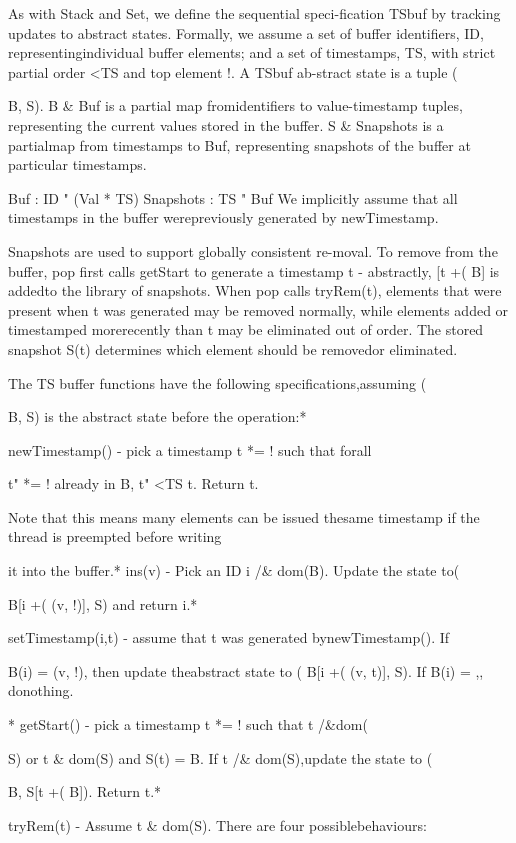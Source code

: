 As with Stack and Set, we define the sequential speci-fication TSbuf by tracking updates to abstract states. Formally, we assume a set of buffer identifiers, ID, representingindividual buffer elements; and a set of timestamps, TS, with
strict partial order <TS and top element !. A TSbuf ab-stract state is a tuple (

B, S). B & Buf is a partial map fromidentifiers to value-timestamp tuples, representing the current values stored in the buffer. S & Snapshots is a partialmap from timestamps to Buf, representing snapshots of the
buffer at particular timestamps.

Buf : ID " (Val * TS) Snapshots : TS " Buf
We implicitly assume that all timestamps in the buffer werepreviously generated by newTimestamp.

Snapshots are used to support globally consistent re-moval. To remove from the buffer, pop first calls getStart
to generate a timestamp t - abstractly, [t +( B] is addedto the library of snapshots. When pop calls tryRem(t), elements that were present when t was generated may be removed normally, while elements added or timestamped morerecently than t may be eliminated out of order. The stored
snapshot S(t) determines which element should be removedor eliminated.

The TS buffer functions have the following specifications,assuming (

B, S) is the abstract state before the operation:*

newTimestamp() - pick a timestamp t *= ! such that forall

t" *= ! already in B, t" <TS t. Return t.

Note that this means many elements can be issued thesame timestamp if the thread is preempted before writing

it into the buffer.*
ins(v) - Pick an ID i /& dom(B). Update the state to(

B[i +( (v, !)], S) and return i.*

setTimestamp(i,t) - assume that t was generated bynewTimestamp(). If

B(i) = (v, !), then update theabstract state to (
B[i +( (v, t)], S). If B(i) = ,, donothing.

* getStart() - pick a timestamp t *= ! such that t /&dom(

S) or t & dom(S) and S(t) = B. If t /& dom(S),update the state to (

B, S[t +( B]). Return t.*

tryRem(t) - Assume t & dom(S). There are four possiblebehaviours:


